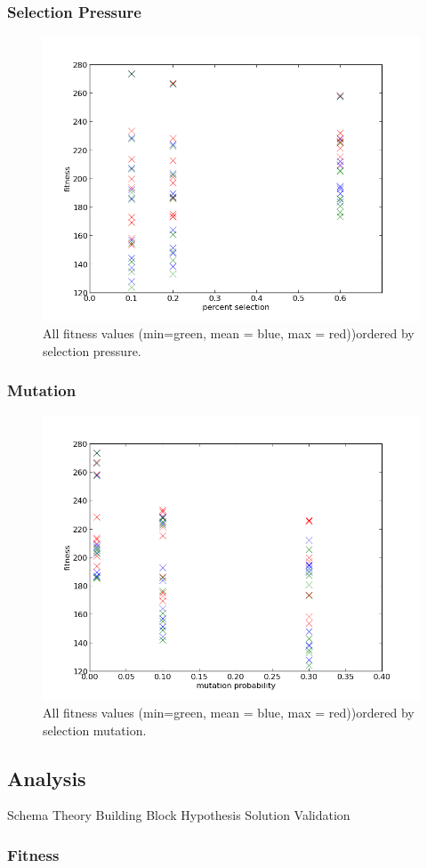 \documentclass{scrartcl}
\begin{document}
\subsubsection{Selection Pressure} 

\begin{figure}
 \center
 \includegraphics[width=.5\linewidth]{img/ex3/tsp_fitness_selection.png}
 \caption{All fitness values (min=green, mean = blue, max = red))ordered by selection pressure.}
\end{figure}


\subsubsection{Mutation}
\begin{figure}
 \center
 \includegraphics[width=.5\linewidth]{img/ex3/tsp_fitness_mutation.png}
 \caption{All fitness values (min=green, mean = blue, max = red))ordered by selection mutation.}
\end{figure}

\subsection{Analysis}
Schema Theory
Building Block Hypothesis
Solution Validation

\subsubsection{Fitness}
\end{document}
